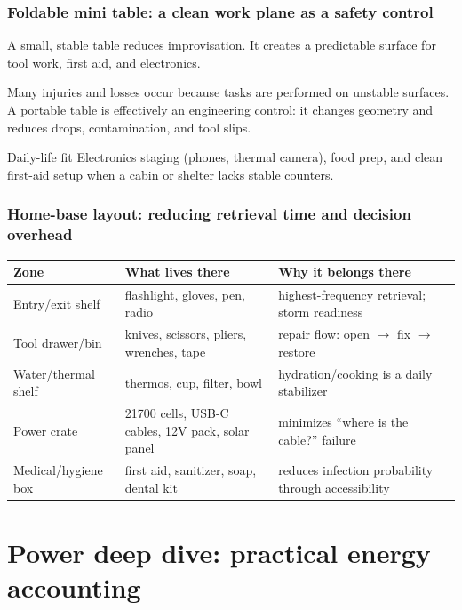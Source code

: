 \begin{frame}[t]
  \frametitle{Foldable mini table: a clean work plane as a safety control}
  \justifying
   A small, stable table reduces improvisation. It creates a predictable surface for tool work, first aid, and electronics.

  \vspace{0.5em}
   Many injuries and losses occur because tasks are performed on unstable surfaces. A portable table is effectively an engineering control: it changes geometry and reduces drops, contamination, and tool slips.

  \vspace{0.8em}
  \begin{block}{Daily-life fit}
    Electronics staging (phones, thermal camera), food prep, and clean first-aid setup when a cabin or shelter lacks stable counters.
  \end{block}
\end{frame}

\begin{frame}[t,shrink=4]
  \frametitle{Home-base layout: reducing retrieval time and decision overhead}
  \justifying
  \DenseBodySize
  \begin{table}
    \centering
    \begin{tabularx}{\textwidth}{@{}lX X@{}}
      \toprule
      \textbf{Zone} & \textbf{What lives there} & \textbf{Why it belongs there} \\
      \midrule
      Entry/exit shelf & flashlight, gloves, pen, radio & highest-frequency retrieval; storm readiness \\
      Tool drawer/bin & knives, scissors, pliers, wrenches, tape & repair flow: open \(\rightarrow\) fix \(\rightarrow\) restore \\
      Water/thermal shelf & thermos, cup, filter, bowl & hydration/cooking is a daily stabilizer \\
      Power crate & 21700 cells, USB-C cables, 12V pack, solar panel & minimizes ``where is the cable?'' failure \\
      Medical/hygiene box & first aid, sanitizer, soap, dental kit & reduces infection probability through accessibility \\
      \bottomrule
    \end{tabularx}
  \end{table}
\end{frame}

\section{Power deep dive: practical energy accounting}

